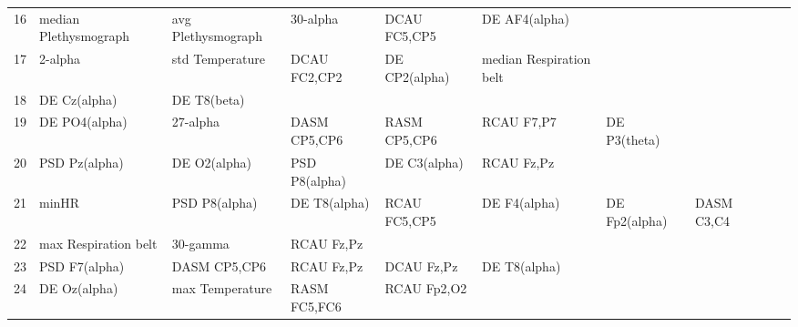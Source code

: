 \begin{landscape}
\begin{table}[]
\begin{tabular}{l|llllllll}
16       & median Plethysmograph & avg Plethysmograph    & 30-alpha             & DCAU FC5,CP5            & DE AF4(alpha)           &                      &                      &                       &                       &                    \\
17       & 2-alpha               & std Temperature       & DCAU FC2,CP2         & DE CP2(alpha)           & median Respiration belt &                      &                      &                       &                       &                    \\
18       & DE Cz(alpha)          & DE T8(beta)           &                      &                         &                         &                      &                      &                       &                       &                    \\
19       & DE PO4(alpha)         & 27-alpha              & DASM CP5,CP6         & RASM CP5,CP6            & RCAU F7,P7              & DE P3(theta)         &                      &                       &                       &                    \\
20       & PSD Pz(alpha)         & DE O2(alpha)          & PSD P8(alpha)        & DE C3(alpha)            & RCAU Fz,Pz              &                      &                      &                       &                       &                    \\
21       & minHR                 & PSD P8(alpha)         & DE T8(alpha)         & RCAU FC5,CP5            & DE F4(alpha)            & DE Fp2(alpha)        & DASM C3,C4           &                       &                       &                    \\
22       & max Respiration belt  & 30-gamma              & RCAU Fz,Pz           &                         &                         &                      &                      &                       &                       &                    \\
23       & PSD F7(alpha)         & DASM CP5,CP6          & RCAU Fz,Pz           & DCAU Fz,Pz              & DE T8(alpha)            &                      &                      &                       &                       &                    \\
24       & DE Oz(alpha)          & max Temperature       & RASM FC5,FC6         & RCAU Fp2,O2             &                         &                      &                      &                       &                       &                    \\

\end{tabular}
\end{table}
\end{landscape}
